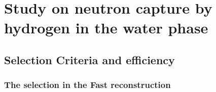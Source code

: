 \section{Study on neutron capture by hydrogen in the water phase}
\subsection{Selection Criteria and efficiency}
\subsubsection{The selection in the Fast reconstruction}


